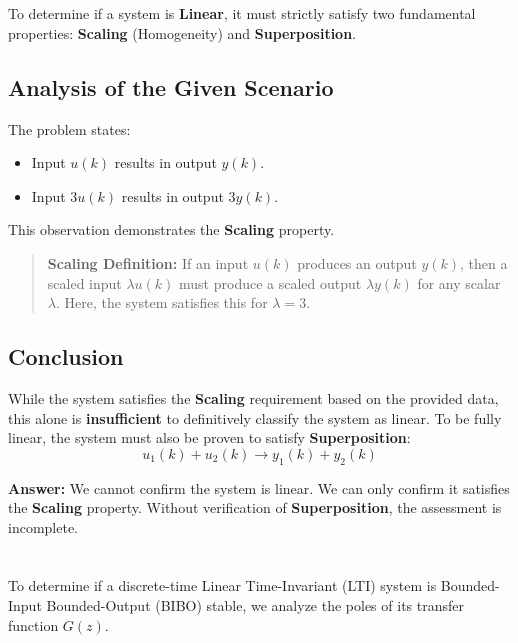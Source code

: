 \documentclass[a4paper,12pt]{article}
\begin{document}
\section{}

To determine if a system is \textbf{Linear}, it must strictly satisfy two fundamental properties: \textbf{Scaling} (Homogeneity) and \textbf{Superposition}.

\subsection{Analysis of the Given Scenario}
The problem states:
\begin{itemize}
    \item Input $u(k)$ results in output $y(k)$.
    \item Input $3u(k)$ results in output $3y(k)$.
\end{itemize}

This observation demonstrates the \textbf{Scaling} property.
\begin{quote}
    \textbf{Scaling Definition:} If an input $u(k)$ produces an output $y(k)$, then a scaled input $\lambda u(k)$ must produce a scaled output $\lambda y(k)$ for any scalar $\lambda$. Here, the system satisfies this for $\lambda = 3$.
\end{quote}

\subsection{Conclusion}
While the system satisfies the \textbf{Scaling} requirement based on the provided data, this alone is \textbf{insufficient} to definitively classify the system as linear. To be fully linear, the system must also be proven to satisfy \textbf{Superposition}:
$$ u_1(k) + u_2(k) \rightarrow y_1(k) + y_2(k) $$

\textbf{Answer:} We cannot confirm the system is linear. We can only confirm it satisfies the \textbf{Scaling} property. Without verification of \textbf{Superposition}, the assessment is incomplete.


\section{}

To determine if a discrete-time Linear Time-Invariant (LTI) system is Bounded-Input Bounded-Output (BIBO) stable, we analyze the poles of its transfer function $G(z)$.
\end{document}
